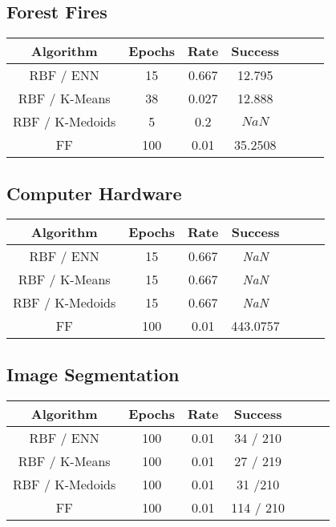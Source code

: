\documentclass[twoside,11pt]{article}
\begin{document}
\subsection{Forest Fires}
\begin{center}
\begin{tabular}{ |c|c|c|c|c|c|c| }
\hline
Algorithm & Epochs & Rate & Success \\
\hline
RBF / ENN & 15 & 0.667 & 12.795 \\
\hline
RBF / K-Means & 38 & 0.027 & 12.888 \\
\hline
RBF / K-Medoids & 5 & 0.2 & $NaN$ \\
\hline
FF & 100 & 0.01 & 35.2508 \\
\hline
\end{tabular}
\end{center}

\subsection{Computer Hardware}
\begin{center}
\begin{tabular}{ |c|c|c|c|c|c|c| }
\hline
Algorithm & Epochs & Rate & Success \\
\hline
RBF / ENN & 15 & 0.667 & \textit{NaN} \\
\hline
RBF / K-Means & 15 & 0.667 & \textit{NaN} \\
\hline
RBF / K-Medoids & 15 & 0.667 & \textit{NaN} \\
\hline
FF & 100 & 0.01 & 443.0757 \\
\hline
\end{tabular}
\end{center}

\subsection{Image Segmentation}
\begin{center}
\begin{tabular}{ |c|c|c|c|c|c|c| }
\hline
Algorithm & Epochs & Rate & Success \\
\hline
RBF / ENN & 100 & 0.01 & 34 / 210 \\
\hline
RBF / K-Means & 100 & 0.01 & 27 / 219 \\
\hline
RBF / K-Medoids & 100 & 0.01 & 31 /210 \\
\hline
FF & 100 & 0.01 & 114 / 210 \\
\hline
\end{tabular}
\end{center}
\end{document}
